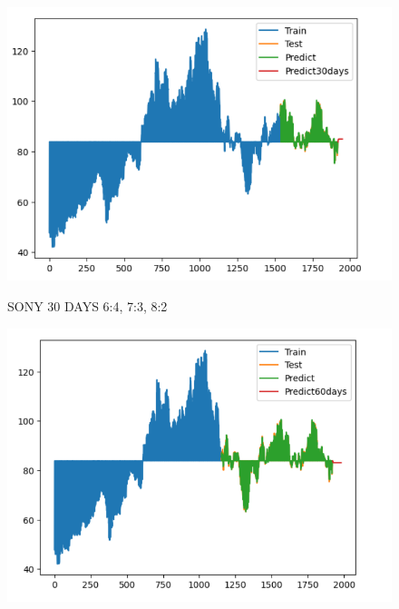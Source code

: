 \documentclass{article}
\begin{document}
\begin{multicols}{2}
\begin{figure}[H]
\begin{minipage}{0.15\textwidth}
    \label{fig:2}
    \end{minipage}%
    \begin{minipage}{0.15\textwidth}
    \centering
    \includegraphics[width=1\textwidth]{Image/GradientBoosting/SONY_30_8_2_GradientBoostingRegressor.png}

    \label{fig:3}
    \end{minipage}
    \caption{SONY 30 DAYS  6:4, 7:3, 8:2 }
\end{figure}

\begin{figure}[H]
    \centering
    \begin{minipage}{0.15\textwidth}
    \centering
    \includegraphics[width=1\textwidth]{Image/GradientBoosting/SONY_60_6_4_GradientBoostingRegressor.png}
   

\end{minipage}
\end{figure}
\end{multicols}
\end{document}
